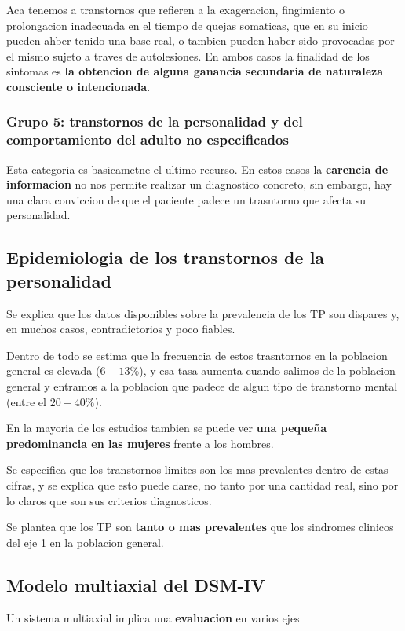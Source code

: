 \documentclass[12pt,a4paper]{article}
\begin{document}
Aca tenemos a transtornos que refieren a la exageracion, fingimiento o prolongacion inadecuada en el tiempo de quejas somaticas, que en su inicio pueden ahber tenido una base real, o tambien pueden haber sido provocadas por el mismo sujeto a traves de autolesiones. En ambos casos la finalidad de los sintomas es \textbf{la obtencion de alguna ganancia secundaria de naturaleza consciente o intencionada}. 

\subsubsection{Grupo 5: transtornos de la personalidad y del comportamiento del adulto no especificados}

Esta categoria es basicametne el ultimo recurso. En estos casos la \textbf{carencia de informacion} no nos permite realizar un diagnostico concreto, sin embargo, hay una clara conviccion de que el paciente padece un trasntorno que afecta su personalidad. 

\subsection{Epidemiologia de los transtornos de la personalidad}

Se explica que los datos disponibles sobre la prevalencia de los TP son dispares y, en muchos casos, contradictorios y poco fiables. 

Dentro de todo se estima que la frecuencia de estos trasntornos en la poblacion general es elevada ($6-13\%$), y esa tasa aumenta cuando salimos de la poblacion general y entramos a la poblacion que padece de algun tipo de transtorno mental (entre el $20-40\%$).

En la mayoria de los estudios tambien se puede ver \textbf{una pequeña predominancia en las mujeres} frente a los hombres. 

Se especifica que los transtornos limites son los mas prevalentes dentro de estas cifras, y se explica que esto puede darse, no tanto por una cantidad real, sino por lo claros que son sus criterios diagnosticos.

Se plantea que los TP son \textbf{tanto o mas prevalentes} que los sindromes clinicos del eje 1 en la poblacion general. 

\subsection{Modelo multiaxial del DSM-IV}

Un sistema multiaxial implica una \textbf{evaluacion} en varios ejes



\newpage
\printbibliography[title={Bibliografía}]
\end{document}
